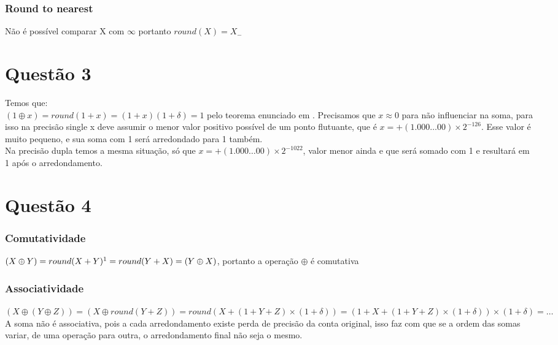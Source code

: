       \subsubsection*{Round to nearest}
        Não é possível comparar X com $\infty$ portanto $round(X) = X_{-}$


  \newpage
  
  \section{Questão 3}
  \label{sec:question3}

    Temos que: \\

    $(1 \oplus x) = round(1 + x) = (1 + x)(1 + \delta) = 1$ pelo teorema enunciado em \cite{numericalIEEE}. Precisamos que $x \approx 0$ para não influenciar na soma, para isso na precisão single x deve assumir o menor valor positivo possível de um ponto flutuante, que é $x = +(1.000 \dots 00) \times 2^{-126}$. Esse valor é muito pequeno, e sua soma com 1 será arredondado para 1 também. \\

    Na precisão dupla temos a mesma situação, só que $x = +(1.000 \dots 00) \times 2^{-1022}$, valor menor ainda e que será somado com 1 e resultará em 1 após o arredondamento.

  \section{Questão 4}
  \label{sec:question4}

    \subsubsection*{Comutatividade}
      $(X \oplus Y) = round(X + Y)\footnote{Comutatividade aritmética} = round(Y + X) = (Y \oplus X)$, portanto a operação $\oplus$ é comutativa

    \subsubsection*{Associatividade}

      $(X \oplus (Y \oplus Z)) = (X \oplus round(Y + Z)) = round(X + (1 + Y + Z) \times (1 + \delta )) = (1 + X + (1 + Y + Z) \times (1 + \delta )) \times (1 + \delta ) = \dots$ \\

      A soma não é associativa, pois a cada arredondamento existe perda de precisão da conta original, isso faz com que se a ordem das somas variar, de uma operação para outra, o arredondamento final não seja o mesmo.


